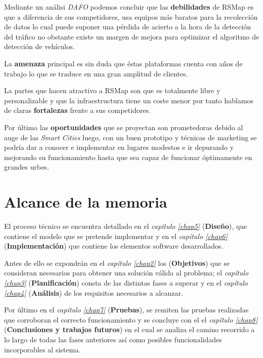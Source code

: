 \newpage

Mediante un análisi \textit{DAFO} podemos concluir que las \textbf{debilidades} de RSMap es que a diferencia de sus competidores, usa equipos más baratos para la recolección de datos lo cual puede suponer una pérdida de acierto a la hora de la detección del tráfico no obstante existe un margen de mejora para optimizar el algoritmo de detección de vehículos.

La \textbf{amenaza} principal es sin duda que éstas plataformas cuenta con años de trabajo lo que se traduce en una gran amplitud de clientes.

La partes que hacen atractivo a RSMap son que es totalmente libre y personalizable y que la infraestructura tiene un coste menor por tanto hablamos de claras \textbf{fortalezas} frente a sus competidores.

Por último las \textbf{oportunidades} que se proyectan son prometedoras debido al auge de las \textit{Smart Cities} luego, con un buen prototipo y técnicas de marketing se podría dar a conocer e implementar en lugares modestos e ir depurando y mejorando su funcionamiento hasta que sea capaz de funcionar óptimamente en grandes urbes.


\section{Alcance de la memoria}

El proceso técnico se encuentra detallado en el \textit{capítulo \ref{chap5}} (\textbf{Diseño}), que contiene el modelo que se pretende implementar y en el \textit{capítulo \ref{chap6}} (\textbf{Implementación}) que contiene los elementos software desarrollados.

Antes de ello se expondrán en el \textit{capítulo \ref{chap2}}  los (\textbf{Objetivos}) que se consideran necesarios para obtener una solución válida al problema; el \textit{capítulo \ref{chap3}} (\textbf{Planificación}) consta de las distintas fases a superar y en el \textit{capítulo \ref{chap4}} (\textbf{Análisis}) de los requisitos necesarios a alcanzar.

\bigskip
Por último en el \textit{capítulo \ref{chap7}} (\textbf{Pruebas}), se remiten las pruebas realizadas que corroboran el correcto funcionamiento y se concluye con el el \textit{capítulo \ref{chap8}}  (\textbf{Conclusiones y trabajos futuros}) en el cual se analiza el camino recorrido a lo largo de todas las fases anteriores así como posibles funcionalidades incorporables al sistema.
